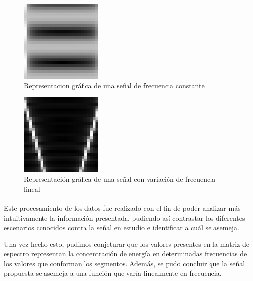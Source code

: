 \documentclass{article}
\begin{document}
        \begin{figure}[h!]
            \centering
            \includegraphics[width=40mm]{constante}
            \caption{Representacion gráfica de una señal de frecuencia constante}
            \label{imagen2}
        \end{figure}

        \begin{figure}[h!]
            \centering
            \includegraphics[width=40mm]{variable}
            \caption{Representación gráfica de una señal con variación de frecuencia lineal}
            \label{imagen3}
        \end{figure}

        \paragraph{}
        Este procesamiento de los datos fue realizado con el fin de poder analizar más intuitivamente la información presentada, 
        pudiendo así contrastar los diferentes escenarios conocidos contra la señal en estudio e identificar a cuál se asemeja.
        
        Una vez hecho esto, pudimos conjeturar que los valores presentes en la matriz de espectro representan la concentración de 
        energía en determinadas frecuencias de los valores que conforman los segmentos. Además, se pudo concluir que la señal propuesta 
        se asemeja a una función que varía linealmente en frecuencia.




    
\end{document}
